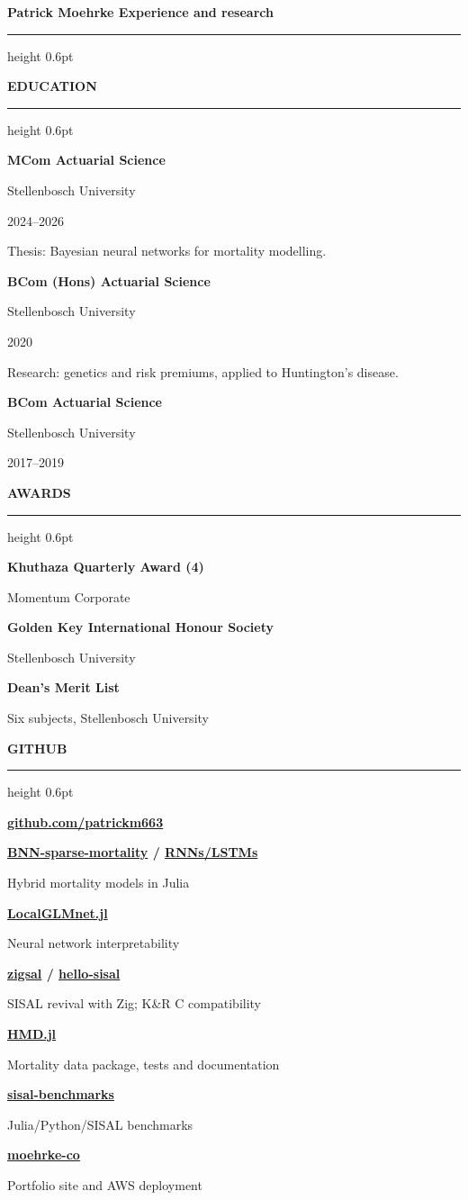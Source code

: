 \documentclass[10pt,a4paper,ragged2e,withhyper]{altacv}
\newcommand{\sidebarentry}[2]{%
  {\bfseries\color{emphasis}#1\par}%
  #2\par\addvspace{8pt}%
}
\newcommand{\sidebarsection}[1]{%
  \par\addvspace{11pt}%
  {\small\bfseries\color{heading}\MakeUppercase{#1}\par}%
  \nobreak\vspace{1.5pt}%
  {\color{headingrule}\hrule height 0.6pt}%
  \nobreak\vspace{7pt}%
}
\newenvironment{cvsidebar}{%
  \begin{minipage}[t]{0.30\textwidth}%
  \vspace{0pt}%
  \begin{tcolorbox}[colback=SidebarFill,colframe=SidebarBorder,
    boxrule=0.5pt,arc=2mm,left=9pt,right=9pt,top=8pt,bottom=8pt,
    before skip=0pt,after skip=0pt]%
  \RaggedRight\fontsize{10}{13}\selectfont
}{%
  \end{tcolorbox}%
  \end{minipage}\hfill
}
\begin{document}
\newpage
{\large\bfseries\color{heading}Patrick Moehrke\hfill
  \small\mdseries\color{MutedColor}Experience and research\par}
\vspace{0.35em}
{\color{headingrule}\hrule height 0.6pt}
\vspace{0.8em}

\begin{cvsidebar}
\sidebarsection{Education}
\sidebarentry{MCom Actuarial Science}{%
  Stellenbosch University\par
  2024--2026\par
  Thesis: Bayesian neural networks for mortality modelling.}
\sidebarentry{BCom (Hons) Actuarial Science}{%
  Stellenbosch University\par
  2020\par
  Research: genetics and risk premiums, applied to Huntington's disease.}
\sidebarentry{BCom Actuarial Science}{%
  Stellenbosch University\par
  2017--2019}

\sidebarsection{Awards}
\sidebarentry{Khuthaza Quarterly Award (4\texttimes)}{Momentum Corporate}
\sidebarentry{Golden Key International Honour Society}{Stellenbosch University}
\sidebarentry{Dean's Merit List}{Six subjects, Stellenbosch University}

\sidebarsection{GitHub}
\href{https://github.com/patrickm663}{\textbf{github.com/patrickm663}}\par
\vspace{8pt}
\sidebarentry{\href{https://github.com/patrickm663/BNN-sparse-mortality}{BNN-sparse-mortality} / \href{https://github.com/patrickm663/bayesian-neural-networks-for-actuarial-mortality-modelling}{RNNs/LSTMs}}{Hybrid mortality models in Julia}
\sidebarentry{\href{https://github.com/patrickm663/localglmnet.jl}{LocalGLMnet.jl}}{Neural network interpretability}
\sidebarentry{\href{https://github.com/patrickm663/zigsal}{zigsal} / \href{https://github.com/patrickm663/hello-sisal}{hello-sisal}}{SISAL revival with Zig; K\&R C compatibility}
\sidebarentry{\href{https://github.com/patrickm663/HMD.jl}{HMD.jl}}{Mortality data package, tests and documentation}
\sidebarentry{\href{https://github.com/patrickm663/sisal-benchmarks}{sisal-benchmarks}}{Julia/Python/SISAL benchmarks}
\sidebarentry{\href{https://github.com/patrickm663/moehrke-co}{moehrke-co}}{Portfolio site and AWS deployment}
\end{cvsidebar}%
\end{document}
